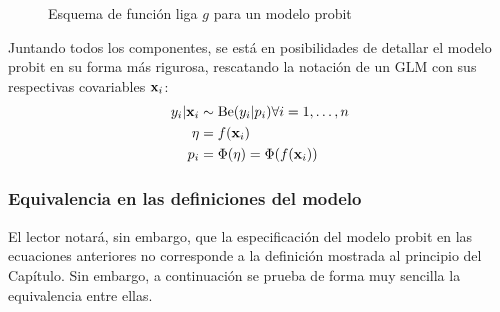 \documentclass[../Main/Main.tex]{subfiles}
\begin{document}
\begin{figure}[h]
\centering
{}
\caption{Esquema de función liga $g$ para un modelo probit}
\label{fig:DiagramaFuncLiga}
\end{figure}

Juntando todos los componentes, se está en posibilidades de detallar el modelo probit en su forma más rigurosa, rescatando la notación de un GLM con sus respectivas covariables $\mathbf{x}_i$: 
\begin{align}
y_i|\mathbf{x}_i & \sim \text{Be}(y_i|p_i)  \forall i = 1,\ldots,n\label{ec:ModProbitA}\\
\eta &= f(\mathbf{x}_i) \label{ec:ModProbitB} \\
p_i &= \Phi(\eta) = \Phi(f(\mathbf{x}_i)) \label{ec:ModProbitC}
\end{align}

\subsubsection*{Equivalencia en las definiciones del modelo}
El lector notará, sin embargo, que la especificación del modelo probit en las ecuaciones anteriores no corresponde a la definición mostrada al principio del Capítulo. Sin embargo, a continuación se prueba de forma muy sencilla la equivalencia entre ellas.\\
\end{document}
